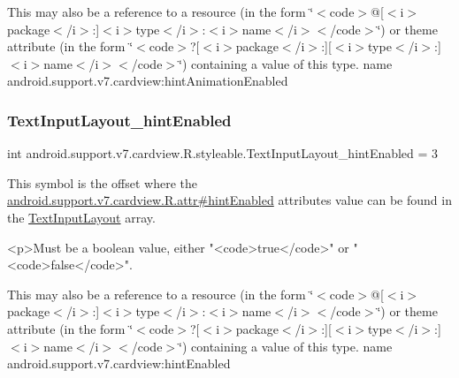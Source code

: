 This may also be a reference to a resource (in the form \char`\"{}$<$code$>$@\mbox{[}$<$i$>$package$<$/i$>$\+:\mbox{]}$<$i$>$type$<$/i$>$\+:$<$i$>$name$<$/i$>$$<$/code$>$\char`\"{}) or theme attribute (in the form \char`\"{}$<$code$>$?\mbox{[}$<$i$>$package$<$/i$>$\+:\mbox{]}\mbox{[}$<$i$>$type$<$/i$>$\+:\mbox{]}$<$i$>$name$<$/i$>$$<$/code$>$\char`\"{}) containing a value of this type.  name android.\+support.\+v7.\+cardview\+:hint\+Animation\+Enabled \mbox{\label{classandroid_1_1support_1_1v7_1_1cardview_1_1R_1_1styleable_a5432983a645efe43960a479cb7a7fb22}} 
\subsubsection{\texorpdfstring{Text\+Input\+Layout\+\_\+hint\+Enabled}{TextInputLayout\_hintEnabled}}
{\footnotesize\ttfamily int android.\+support.\+v7.\+cardview.\+R.\+styleable.\+Text\+Input\+Layout\+\_\+hint\+Enabled = 3\hspace{0.3cm}{\ttfamily [static]}}

This symbol is the offset where the \hyperlink{classandroid_1_1support_1_1v7_1_1cardview_1_1R_1_1attr_a0b045f46ce9994e6d9faaf73f4bbc6d8}{android.\+support.\+v7.\+cardview.\+R.\+attr\#hint\+Enabled} attribute\textquotesingle{}s value can be found in the \hyperlink{classandroid_1_1support_1_1v7_1_1cardview_1_1R_1_1styleable_a9b23c31ffaf354f0f5cc4b82392ef6a4}{Text\+Input\+Layout} array.

\begin{DoxyVerb}      <p>Must be a boolean value, either "<code>true</code>" or "<code>false</code>".
\end{DoxyVerb}
 

This may also be a reference to a resource (in the form \char`\"{}$<$code$>$@\mbox{[}$<$i$>$package$<$/i$>$\+:\mbox{]}$<$i$>$type$<$/i$>$\+:$<$i$>$name$<$/i$>$$<$/code$>$\char`\"{}) or theme attribute (in the form \char`\"{}$<$code$>$?\mbox{[}$<$i$>$package$<$/i$>$\+:\mbox{]}\mbox{[}$<$i$>$type$<$/i$>$\+:\mbox{]}$<$i$>$name$<$/i$>$$<$/code$>$\char`\"{}) containing a value of this type.  name android.\+support.\+v7.\+cardview\+:hint\+Enabled \mbox{\label{classandroid_1_1support_1_1v7_1_1cardview_1_1R_1_1styleable_a15aeb1e9b65b899047a6cf8619716946}} 
